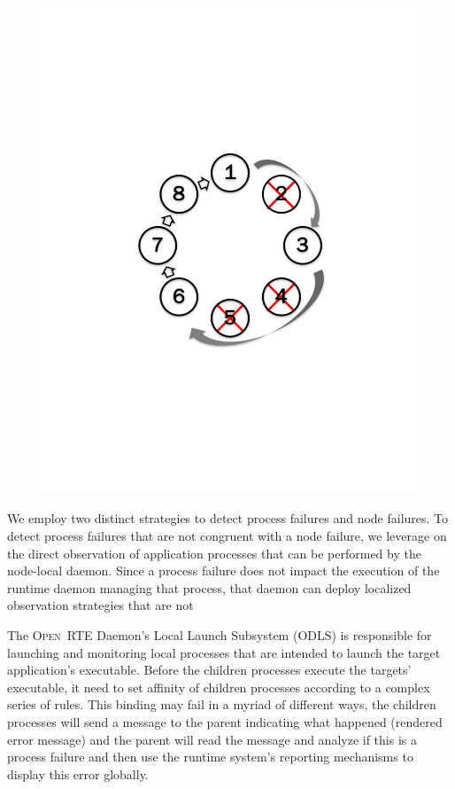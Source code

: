 \documentclass[sigconf]{acmart}
\newcommand{\orte}[0]{\textsc{Open~RTE}\xspace}
\begin{document}
\begin{figure}
\begin{minipage}{.23\textwidth}
  \includegraphics[trim=3cm 8.0cm 3cm 8cm,width=\linewidth]{reconnet_cross.pdf}
  \label{fig:ReconnectRing}
\end{minipage}
\end{figure}

We employ two distinct strategies to detect process failures and node failures. 
To detect process failures that are not congruent with a node failure, we 
leverage on the direct observation of application processes that can be 
performed by the node-local daemon. Since a process failure does not 
impact the execution of the runtime daemon managing that process, that 
daemon can deploy localized observation strategies that are not 

The \orte Daemon's Local Launch Subsystem (ODLS) is responsible for launching and monitoring local processes that are intended to launch the target application's executable. Before the children processes execute the targets' executable, it need to set affinity of children processes according to a complex series of rules. This binding may fail in a myriad of different ways, the children processes will send a message to the parent indicating what happened (rendered error message) and the parent will read the message and analyze if this is a process failure and then use the runtime system's reporting mechanisms to display this error globally. 
\end{document}
